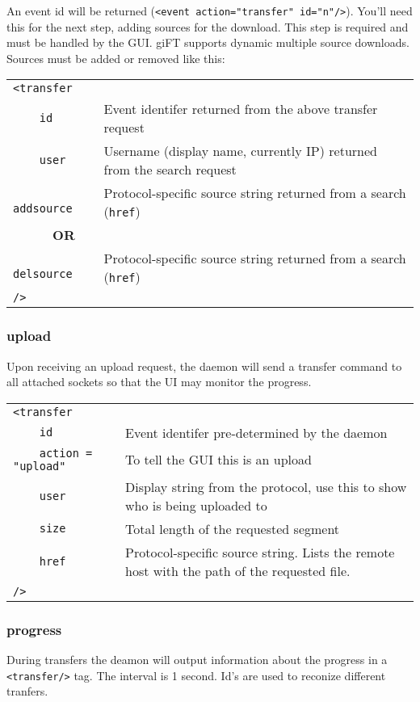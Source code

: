 \documentclass[10pt]{article}
\begin{document}
An event id will be returned (\verb|<event action="transfer" id="n"/>|). You'll
need this for the next step, adding sources for the download. This step is
required and must be handled by the GUI. giFT supports dynamic multiple source
downloads. Sources must be added or removed like this:

\begin{tabular}{p{2.6cm}p{8.5cm}}
\verb|<transfer|        &  \\
\verb|    id|           & Event identifer returned from the above transfer request \\
\verb|    user|         & Username (display name, currently IP) returned from the search request \\
\verb|    addsource|    & Protocol-specific source string returned from a search (\verb|href|) \\
\verb|      |\textbf{OR}  & \\
\verb|    delsource|    & Protocol-specific source string returned from a search (\verb|href|) \\
\verb|/>|               &
\end{tabular}

\subsubsection{upload}
Upon receiving an upload request, the daemon will send a transfer command to
all attached sockets so that the UI may monitor the progress.

\begin{tabular}{p{3.9cm}p{7.2cm}}
\verb|<transfer|    &  \\
\verb|    id|       & Event identifer pre-determined by the daemon \\
\verb|    action = "upload"| & To tell the GUI this is an upload \\
\verb|    user|     & Display string from the protocol, use this to show who is being uploaded to \\
\verb|    size|     & Total length of the requested segment \\
\verb|    href|     & Protocol-specific source string. Lists the remote host with the path of the requested file. \\
\verb|/>|               &
\end{tabular}

\subsubsection{progress}
During transfers the deamon will output information about the progress in a
\verb|<transfer/>| tag. The interval is 1 second. Id's are used to reconize
different tranfers.
\end{document}
